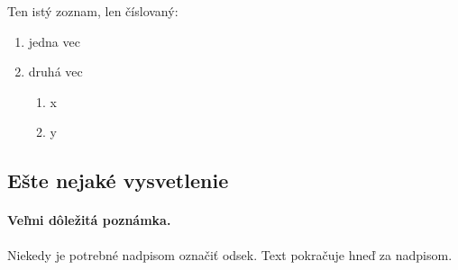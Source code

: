 \documentclass[10pt,oneside,slovak,a4paper]{article}
\begin{document}
Ten istý zoznam, len číslovaný:

\begin{enumerate}
\item jedna vec
\item druhá vec
	\begin{enumerate}
	\item x
	\item y
	\end{enumerate}
\end{enumerate}


\subsection{Ešte nejaké vysvetlenie} \label{ina:este}

\paragraph{Veľmi dôležitá poznámka.}
Niekedy je potrebné nadpisom označiť odsek. Text pokračuje hneď za nadpisom.
\cite{Djamas_Ramli}






\end{document}
